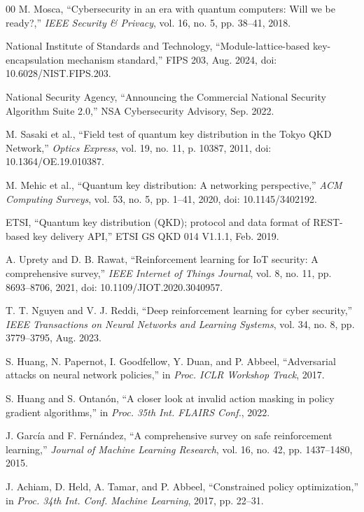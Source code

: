 \documentclass[conference]{IEEEtran}
\begin{document}
\begin{thebibliography}{00}
 M. Mosca, ``Cybersecurity in an era with quantum computers: Will we
be ready?,'' \emph{IEEE Security \& Privacy}, vol. 16, no. 5, pp. 38--41, 2018.

 National Institute of Standards and Technology, ``Module-lattice-based
key-encapsulation mechanism standard,'' FIPS 203, Aug. 2024, doi:
10.6028/NIST.FIPS.203.

 National Security Agency, ``Announcing the Commercial National Security Algorithm Suite 2.0,'' NSA Cybersecurity Advisory, Sep. 2022.

 M. Sasaki et al., ``Field test of quantum key distribution in the Tokyo
QKD Network,'' \emph{Optics Express}, vol. 19, no. 11, p. 10387, 2011, doi:
10.1364/OE.19.010387.

 M. Mehic et al., ``Quantum key distribution: A networking perspective,'' \emph{ACM Computing Surveys}, vol. 53, no. 5, pp. 1--41, 2020, doi:
10.1145/3402192.

 ETSI, ``Quantum key distribution (QKD); protocol and data format of
REST-based key delivery API,'' ETSI GS QKD 014 V1.1.1, Feb. 2019.

 A. Uprety and D. B. Rawat, ``Reinforcement learning for IoT security:
A comprehensive survey,'' \emph{IEEE Internet of Things Journal}, vol. 8, no.
11, pp. 8693--8706, 2021, doi: 10.1109/JIOT.2020.3040957.

 T. T. Nguyen and V. J. Reddi, ``Deep reinforcement learning for cyber
security,'' \emph{IEEE Transactions on Neural Networks and Learning Systems},
vol. 34, no. 8, pp. 3779--3795, Aug. 2023.

 S. Huang, N. Papernot, I. Goodfellow, Y. Duan, and P. Abbeel, ``Adversarial attacks on neural network policies,'' in \emph{Proc. ICLR Workshop
Track}, 2017.

 S. Huang and S. Ontan\'{o}n, ``A closer look at invalid action masking in
policy gradient algorithms,'' in \emph{Proc. 35th Int. FLAIRS Conf.}, 2022.

 J. Garc\'{i}a and F. Fern\'{a}ndez, ``A comprehensive survey on safe reinforcement learning,'' \emph{Journal of Machine Learning Research}, vol. 16, no. 42,
pp. 1437--1480, 2015.

 J. Achiam, D. Held, A. Tamar, and P. Abbeel, ``Constrained policy
optimization,'' in \emph{Proc. 34th Int. Conf. Machine Learning}, 2017, pp.
22--31.


\end{thebibliography}
\end{document}
